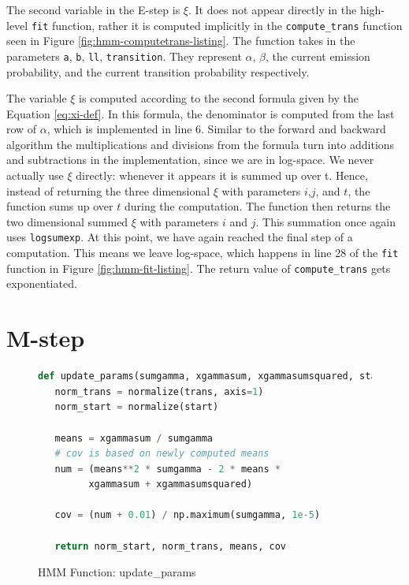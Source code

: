 The second variable in the E-step is $\xi$. It does not appear directly in the high-level \texttt{fit} function, rather it is computed implicitly in the \texttt{compute\_trans} function seen in Figure \ref{fig:hmm-computetrans-listing}. The function takes in the parameters \texttt{a}, \texttt{b}, \texttt{ll}, \texttt{transition}. They represent $\alpha$, $\beta$, the current emission probability, and the current transition probability respectively. 

The variable $\xi$ is computed according to the second formula given by the Equation \eqref{eq:xi-def}. In this formula, the denominator is computed from the last row of $\alpha$, which is implemented in line 6. Similar to the forward and backward algorithm the multiplications and divisions from the formula turn into additions and subtractions in the implementation, since we are in log-space. 
We never actually use $\xi$ directly: whenever it appears it is summed up over t. Hence, instead of returning the three dimensional $\xi$ with parameters $i$,$j$, and $t$, the function sums up over $t$ during the computation. The function then returns the two dimensional summed $\xi$ with parameters $i$ and $j$. This summation once again uses \texttt{logsumexp}. At this point, we have again reached the final step of a computation. This means we leave log-space, which happens in line 28 of the \texttt{fit} function in Figure \ref{fig:hmm-fit-listing}. The return value of \texttt{compute\_trans} gets exponentiated. 

\section{M-step}

\begin{figure}
\begin{singlespace}
\begin{lstlisting}[language=Python]
def update_params(sumgamma, xgammasum, xgammasumsquared, start, trans):
   norm_trans = normalize(trans, axis=1)
   norm_start = normalize(start)

   means = xgammasum / sumgamma
   # cov is based on newly computed means
   num = (means**2 * sumgamma - 2 * means *
         xgammasum + xgammasumsquared)

   cov = (num + 0.01) / np.maximum(sumgamma, 1e-5)

   return norm_start, norm_trans, means, cov
\end{lstlisting}
\end{singlespace}
\caption{HMM Function: update\_params}    
\label{fig:hmm-updateparams-listing}
\end{figure}


